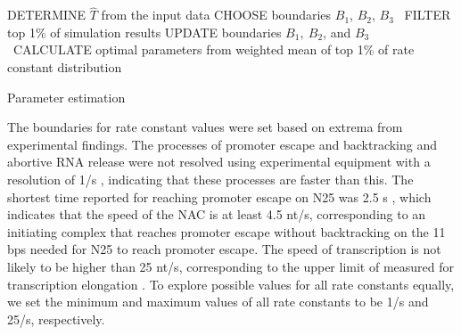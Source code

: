\begin{algorithm}[htb]
\newcommand{\forcond}{$i=0$ \KwTo $n$}
%
{}
 \BlankLine
   DETERMINE $\hat T$ from the input data \;
   CHOOSE boundaries $B_1$, $B_2$, $B_3$ \; 
    \
    FILTER top 1\% of simulation results \;
    UPDATE boundaries $B_1,\ B_2$, and $B_3$ \;  
    \
   CALCULATE optimal parameters from weighted mean of top 1\% of rate constant
   distribution\;  
   \Output{$k_u$, $k_n$, $k_e$ and $k_{b,i}$}
\caption{Parameter estimation}
\end{algorithm}

The boundaries for rate constant values were set based on extrema from
experimental findings. The processes of promoter escape and backtracking and
abortive RNA release were not resolved using experimental equipment with a
resolution of 1/s \cite{revyakin_abortive_2006}, indicating that these
processes are faster than this. The shortest time reported for reaching
promoter escape on N25 was 2.5 s \cite{revyakin_abortive_2006}, which
indicates that the speed of the NAC is at least 4.5 nt/s, corresponding to an
initiating complex that reaches promoter escape without backtracking on the 11
bps needed for N25 to reach promoter escape. The speed of transcription is not
likely to be higher than 25 nt/s, corresponding to the upper limit of measured
for transcription elongation \cite{bai_mechanochemical_2007}. To explore
possible values for all rate constants equally, we set the minimum and maximum
values of all rate constants to be 1/s and 25/s, respectively.
